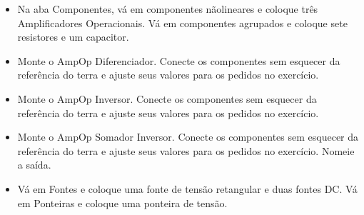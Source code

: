 
\begin{itemize}
    \item Na aba Componentes, vá em componentes nãolineares e coloque três Amplificadores Operacionais.
    Vá em componentes agrupados e coloque sete
    resistores e um capacitor.
\end{itemize}

\begin{figure}[H]
\end{figure}

\begin{itemize}
    \item  Monte o AmpOp Diferenciador. Conecte os
    componentes sem esquecer da referência do terra e
    ajuste seus valores para os pedidos no exercício.
\end{itemize}


\begin{itemize}
    \item Monte o AmpOp Inversor. Conecte os componentes
    sem esquecer da referência do terra e ajuste seus
    valores para os pedidos no exercício.
\end{itemize}


\begin{itemize}
    \item Monte o AmpOp Somador Inversor. Conecte os
    componentes sem esquecer da referência do terra e
    ajuste seus valores para os pedidos no exercício.
    Nomeie a saída.
\end{itemize}


\begin{itemize}
    \item Vá em Fontes e coloque uma fonte de tensão
    retangular e duas fontes DC. Vá em Ponteiras e
    coloque uma ponteira de tensão.
\end{itemize}

\begin{figure}[H]


\end{figure}

